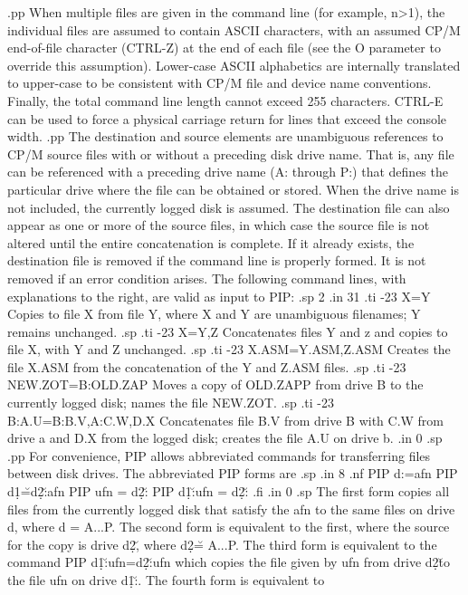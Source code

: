 .pp
When multiple files are given in the command line (for example, 
n>1), the individual
files are assumed to contain ASCII characters, with an assumed CP/M
end-of-file character (CTRL-Z) at the end of each file (see the O parameter
to override this assumption).  Lower-case ASCII alphabetics are internally
translated to upper-case to be consistent with CP/M file and device name
conventions.  Finally, the total command line length cannot exceed 255
characters.  CTRL-E can be used to force a physical carriage return for lines
that exceed the console width.
.pp
The destination and source elements are unambiguous references to CP/M source
files with or without a preceding disk drive name.  That is, any file can be
referenced with a preceding drive name (A: through P:) that defines the
particular drive where the file can be obtained or stored.  When the drive
name is not included, the currently logged disk is assumed.  The
destination file can also appear as one or more of the source files, in
which case the source file is not altered until the entire concatenation is
complete.  If it already exists, the destination file is removed if the
command line is properly formed.  It is not removed if an error condition
arises.  The following command lines, with explanations to the 
right, are
valid as input to PIP:
.sp 2
.in 31
.ti -23
X=Y                    Copies to file X from file Y, where X and Y are
unambiguous filenames; Y remains unchanged.
.sp
.ti -23
X=Y,Z                  Concatenates files Y and z and copies to file X,
with Y and Z unchanged.
.sp
.ti -23
X.ASM=Y.ASM,Z.ASM      Creates the file X.ASM from the concatenation of the
Y and Z.ASM files.
.sp
.ti -23
NEW.ZOT=B:OLD.ZAP      Moves a copy of OLD.ZAPP from drive B to the currently
logged disk; names the file NEW.ZOT.
.sp
.ti -23
B:A.U=B:B.V,A:C.W,D.X  Concatenates file B.V from drive B with C.W from drive
a and D.X from the logged disk; creates the file A.U on drive b.
.in 0
.sp
.pp
For convenience, PIP allows abbreviated commands for transferring files
between disk drives.  The abbreviated PIP forms are
.sp
.in 8
.nf
PIP d:=afn
PIP d\d1\u=d\d2\u:afn
PIP ufn = d\d2\u:
PIP d\d1\u:ufn = d\d2\u:
.fi
.in 0
.sp
The first form copies all files from the currently logged disk that satisfy
the afn to the same files on drive d, where d = A...P.  The second form is
equivalent to the first, where the source for the copy is drive 
d\d2\u, where d\d2\u = A...P.  The third form is equivalent to the command PIP
d\d1\u:ufn=d\d2\u:ufn which copies the file given by ufn from drive
d\d2\u to the file ufn on drive d\d1\u:.  The fourth form is equivalent to
